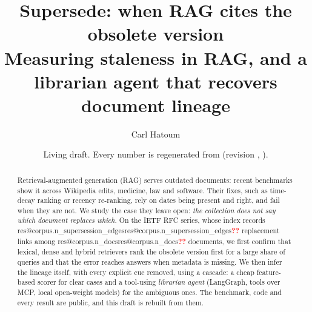 \documentclass[11pt,a4paper]{article}
\title{\sffamily\bfseries\color{ink}Supersede: when RAG cites the obsolete version\\[6pt]
\normalfont\large\color{ink2}Measuring staleness in RAG, and a librarian agent
that recovers document lineage}
\author{Carl Hatoum}
\date{\small\color{ink2}Living draft. Every number is regenerated from
\code{results/} (revision \code{\res{meta.rev}}, \res{meta.date}).}
\makeatletter
\newcommand{\res}[1]{\ifcsname res@#1\endcsname\csname res@#1\endcsname\else\textcolor{red}{\textbf{??}}\fi}
\makeatother
\begin{document}
\maketitle
\thispagestyle{empty}

\begin{abstract}\noindent
Retrieval-augmented generation (RAG) serves outdated documents: recent benchmarks
show it across Wikipedia edits, medicine, law and software. Their fixes, such as
time-decay ranking or recency re-ranking, rely on dates being present and right,
and fail when they are not. We study the case they leave open: \emph{the collection
does not say which document replaces which}. On the IETF RFC series, whose index
records \res{corpus.n_supersession_edges} replacement links among
\res{corpus.n_docs} documents, we first confirm that lexical, dense and hybrid
retrievers rank the obsolete version first for a large share of queries and that
the error reaches answers when metadata is missing. We then infer the lineage
itself, with every explicit cue removed, using a cascade: a cheap feature-based
scorer for clear cases and a tool-using \emph{librarian agent} (LangGraph, tools
over MCP, local open-weight models) for the ambiguous ones. The benchmark, code
and every result are public, and this draft is rebuilt from them.
\end{abstract}
\end{document}
